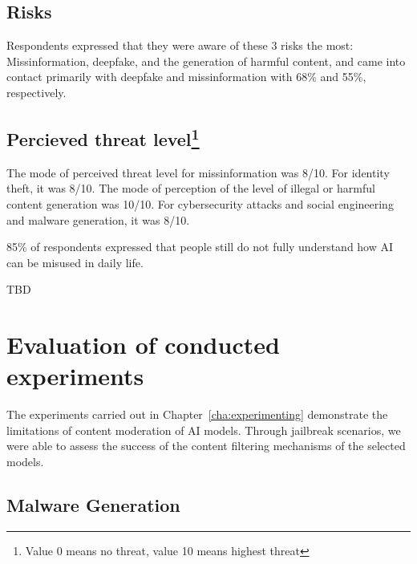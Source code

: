 \subsection*{Risks}

Respondents expressed that they were aware of these 3 risks the most: Missinformation, deepfake, and the generation of harmful content, and came into contact primarily with deepfake and missinformation with 68\% and 55\%, respectively.

\subsection*{Percieved threat level\footnote{Value 0 means no threat, value 10 means highest threat}}

The mode of perceived threat level for missinformation was 8/10.
For identity theft, it was 8/10.
The mode of perception of the level of illegal or harmful content generation was 10/10.
For cybersecurity attacks and social engineering and malware generation, it was 8/10.


85\% of respondents expressed that people still do not fully understand how AI can be misused in daily life.

TBD


    
    
    

\section{Evaluation of conducted experiments}

The experiments carried out in Chapter~\ref{cha:experimenting} demonstrate the limitations of content moderation of AI models. Through jailbreak scenarios, we were able to assess the success of the content filtering mechanisms of the selected models.

\subsection*{Malware Generation}

